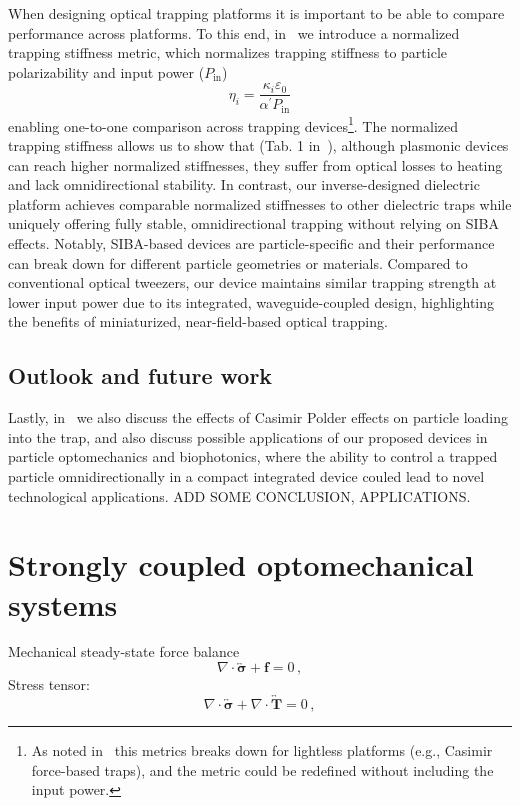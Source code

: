 When designing optical trapping platforms it is important to be able to compare performance across platforms. To this end, in~\cite{ownpub3} we introduce a normalized
trapping stiffness metric, which normalizes trapping stiffness to particle  polarizability and input power ($P_\text{in}$)
\begin{equation}
    \eta_i=\frac{\kappa_i \varepsilon_0}{\alpha^\prime P_{\text{in}}}
\end{equation}
enabling one-to-one comparison across trapping devices\footnote{As noted in~\cite{ownpub3} this metrics breaks down for lightless platforms (e.g., Casimir force-based traps), and the metric could be redefined
without including the input power.}. The normalized trapping stiffness allows us to show that (Tab. 1 in~\cite{ownpub3}), although plasmonic devices can reach higher normalized 
stiffnesses, they suffer from optical losses to heating and lack omnidirectional stability. In contrast, our inverse-designed dielectric platform
 achieves comparable normalized stiffnesses to other dielectric traps while uniquely offering fully stable, omnidirectional trapping
  without relying on SIBA effects. Notably, SIBA-based devices are particle-specific and their performance can break down
   for different particle geometries or materials. Compared to conventional optical tweezers, our device maintains similar trapping
    strength at lower input power due to its integrated, waveguide-coupled design, highlighting the benefits of miniaturized,
     near-field-based optical trapping.

\subsection*{Outlook and future work}

Lastly, in~\cite{ownpub2} we also discuss the effects of Casimir Polder effects on particle loading into the trap, and
also discuss possible applications of our proposed devices in particle optomechanics and
biophotonics, where the ability to control a trapped particle omnidirectionally in a compact integrated device
couled lead to novel technological applications. ADD SOME CONCLUSION, APPLICATIONS.

\section{Strongly coupled optomechanical systems}\label{sec:mech_strongly_coupled}

Mechanical steady-state force balance
\begin{equation}
    \nabla \cdot \overleftrightarrow{\boldsymbol{\sigma}} + \mathbf{f} = 0\,,
\end{equation}
Stress tensor:
\begin{equation}
    \nabla \cdot \overleftrightarrow{\boldsymbol{\sigma}} + \nabla \cdot \overleftrightarrow{\mathbf{T}} = 0\,,
\end{equation}

